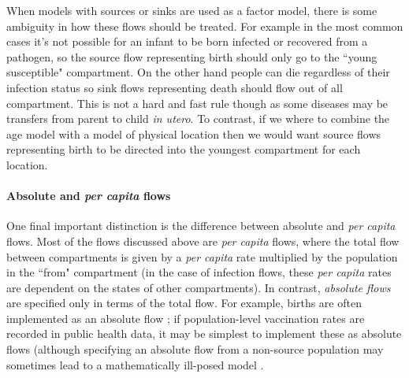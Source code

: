 When models with sources or sinks are used as a factor model, there is some ambiguity in how these flows should be treated. For example in the most common cases it's not possible for an infant to be born infected or recovered from a pathogen, so the source flow representing birth should only go to the ``young susceptible" compartment. On the other hand people can die regardless of their infection status so sink flows representing death should flow out of all compartment. This is not a hard and fast rule though as some diseases may be transfers from parent to child \emph{in utero}. To contrast, if we where to combine the age model with a model of physical location then we would want source flows representing birth to be directed into the youngest compartment for each location.

\paragraph{Absolute and \emph{per capita} flows}

One final important distinction is the difference between absolute and \emph{per capita} flows. Most of the flows discussed above are \emph{per capita} flows, \ie where the total flow between compartments is given by a \emph{per capita} rate multiplied by the population in the ``from" compartment
(in the case of infection flows, these \emph{per capita} rates are dependent on the states of other compartments).
In contrast, \emph{absolute flows} are specified only in terms of the total flow. For example, births are often implemented as an absolute flow \citep{Earn2008}; if population-level vaccination rates are recorded in public health data, it may be simplest to implement these as absolute flows (although specifying an absolute flow from a non-source population may sometimes lead to a mathematically ill-posed model \citep{gharouni2022testing}.



